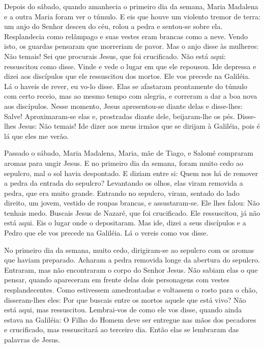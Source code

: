 \documentclass{rosario}
\begin{document}

Depois do sábado, quando amanhecia o primeiro dia da semana, Maria Madalena e a outra Maria foram ver o túmulo.
E eis que houve um violento tremor de terra:
um anjo do Senhor desceu do céu, rolou a pedra e sentou-se sobre ela.
Resplandecia como relâmpago e suas vestes eram brancas como a neve.
Vendo isto, os guardas pensaram que morreriam de pavor.
Mas o anjo disse às mulheres:
Não temais! Sei que procurais Jesus, que foi crucificado.
Não está aqui:
ressuscitou como disse.
Vinde e vede o lugar em que ele repousou.
Ide depressa e dizei aos discípulos que ele ressuscitou dos mortos.
Ele vos precede na Galiléia.
Lá o haveis de rever, eu vo-lo disse.
Elas se afastaram prontamente do túmulo com certo receio, mas ao mesmo tempo com alegria, e correram a dar a boa nova aos discípulos.
Nesse momento, Jesus apresentou-se diante delas e disse-lhes:
Salve! Aproximaram-se elas e, prostradas diante dele, beijaram-lhe os pés.
Disse-lhes Jesus:
Não temais! Ide dizer aos meus irmãos que se dirijam à Galiléia, pois é lá que eles me verão.


Passado o sábado, Maria Madalena, Maria, mãe de Tiago, e Salomé compraram aromas para ungir Jesus.
E no primeiro dia da semana, foram muito cedo ao sepulcro, mal o sol havia despontado.
E diziam entre si:
Quem nos há de remover a pedra da entrada do sepulcro?
Levantando os olhos, elas viram removida a pedra, que era muito grande.
Entrando no sepulcro, viram, sentado do lado direito, um jovem, vestido de roupas brancas, e assustaram-se.
Ele lhes falou:
Não tenhais medo.
Buscais Jesus de Nazaré, que foi crucificado.
Ele ressuscitou, já não está aqui.
Eis o lugar onde o depositaram.
Mas ide, dizei a seus discípulos e a Pedro que ele vos precede na Galiléia.
Lá o vereis como vos disse.


No primeiro dia da semana, muito cedo, dirigiram-se ao sepulcro com os aromas que haviam preparado.
Acharam a pedra removida longe da abertura do sepulcro.
Entraram, mas não encontraram o corpo do Senhor Jesus.
Não sabiam elas o que pensar, quando apareceram em frente delas dois personagens com vestes resplandecentes.
Como estivessem amedrontadas e voltassem o rosto para o chão, disseram-lhes eles:
Por que buscais entre os mortos aquele que está vivo?
Não está aqui, mas ressuscitou.
Lembrai-vos de como ele vos disse, quando ainda estava na Galiléia:
O Filho do Homem deve ser entregue nas mãos dos pecadores e crucificado, mas ressuscitará ao terceiro dia.
Então elas se lembraram das palavras de Jesus.
\end{document}
